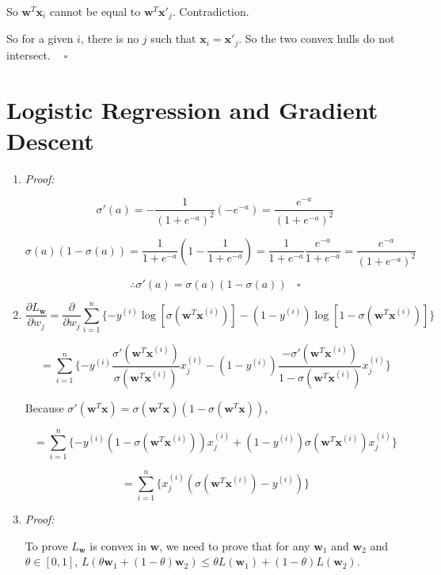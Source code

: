 \documentclass[paper=letter, fontsize=12pt]{article}
\begin{document}
So $\mathbf{w}^T \mathbf{x}_i$ cannot be equal to $\mathbf{w}^T \mathbf{x'}_j$. Contradiction.

So for a given $i$, there is no $j$ such that $\mathbf{x}_i = \mathbf{x'}_j$. So the two convex hulls do not intersect. $\ \ \ \ \square$

\section{Logistic Regression and Gradient Descent}

\begin{enumerate}[label=(\alph*)]

	\item 
	
	\textit{Proof:}
	
	$$\sigma'(a) = - \frac{1}{(1 + e^{-a})^2} (-e^{-a}) = \frac{e^{-a}}{(1 + e^{-a})^2}$$
	
	$$\sigma(a)(1 - \sigma(a)) = \frac{1}{1 + e^{-a}} (1 - \frac{1}{1 + e^{-a}}) = \frac{1}{1 + e^{-a}} \frac{e^{-a}}{1 + e^{-a}} = \frac{e^{-a}}{(1 + e^{-a})^2}$$
	
	$$\therefore \sigma'(a) = \sigma(a)(1 - \sigma(a)) \ \ \ \ \square$$
	
	\item 
	
	$$\frac{\partial L_{\mathbf{w}}}{\partial w_j} = \frac{\partial }{\partial w_j} \sum_{i = 1}^{n}\{-y^{(i)} \log[\sigma(\mathbf{w}^T \mathbf{x}^{(i)})] - (1 - y^{(i)}) \log[1 - \sigma(\mathbf{w}^T \mathbf{x}^{(i)})] \} $$
	
	$$= \sum_{i = 1}^{n} \{-y^{(i)} \frac{\sigma'(\mathbf{w}^T \mathbf{x}^{(i)})}{\sigma(\mathbf{w}^T \mathbf{x}^{(i)})} x^{(i)}_j - (1 - y^{(i)}) \frac{-\sigma'(\mathbf{w}^T \mathbf{x}^{(i)})}{1 - \sigma(\mathbf{w}^T \mathbf{x}^{(i)}) } x^{(i)}_j \}$$
	
	Because $\sigma'(\mathbf{w}^T \mathbf{x}) = \sigma(\mathbf{w}^T \mathbf{x}) (1 - \sigma(\mathbf{w}^T \mathbf{x}) )$,
	
	$$= \sum_{i = 1}^{n} \{-y^{(i)} (1 - \sigma(\mathbf{w}^T \mathbf{x}^{(i)})) x^{(i)}_j + (1 - y^{(i)}) \sigma(\mathbf{w}^T \mathbf{x}^{(i)}) x^{(i)}_j \}$$
	
	$$= \sum_{i = 1}^{n} \{ x^{(i)}_j (\sigma(\mathbf{w}^T \mathbf{x}^{(i)}) - y^{(i)}) \}$$
	
	\item \textit{Proof:}
	
	To prove $L_{\mathbf{w}}$ is convex in $\mathbf{w}$, we need to prove that for any $\mathbf{w}_1$ and $\mathbf{w}_2$ and $\theta \in [0, 1]$, $L(\theta \mathbf{w}_1 + (1- \theta) \mathbf{w}_2) \leq \theta L(\mathbf{w}_1) + (1 - \theta) L(\mathbf{w}_2)$.
	

\end{enumerate}
\end{document}
